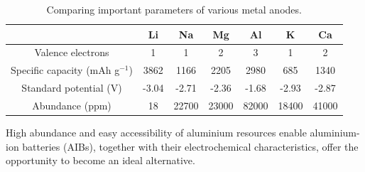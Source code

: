 \begin{table}[tbh!]
\caption{Comparing important parameters of various metal anodes.} \label{table2}
\begin{tabular}{|ccccccc|}
\hline
 & \textbf{Li} & \textbf{Na} & \textbf{Mg} & \textbf{Al} & \textbf{K} & \textbf{Ca}\\
\hline
\hline
Valence electrons & 1 & 1 & 2 & 3 & 1 & 2\\
Specific capacity (mAh g$^{-1}$) & 3862 & 1166 & 2205 & 2980 & 685 & 1340\\
Standard potential (V) & -3.04 & -2.71 & -2.36  & -1.68 & -2.93 & -2.87\\
Abundance (ppm) & 18 & 22700 & 23000 & 82000 & 18400 & 41000\\
\hline  %
\end{tabular}
\end{table}

High abundance and easy accessibility of aluminium resources enable aluminium-ion batteries (AIBs), together with their electrochemical characteristics, offer the opportunity to become an ideal alternative.

